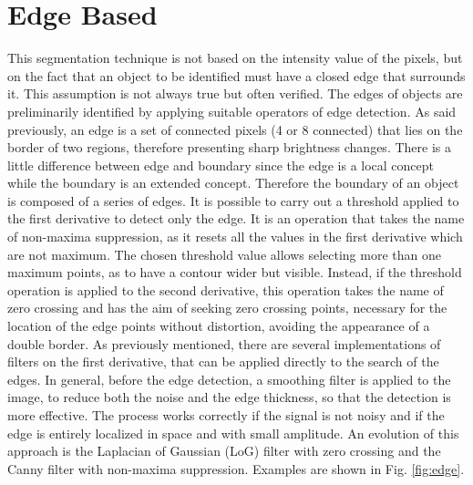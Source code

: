 \section{Edge Based}
This segmentation technique is not based on the intensity value of the pixels, but on the fact that an object to be identified must have a closed edge that surrounds it. This assumption is not always true but often verified. The edges of objects are preliminarily identified by applying suitable operators of edge detection. As said previously, an edge is a set of connected pixels (4 or 8 connected) that lies on the border of two regions, therefore presenting sharp brightness changes. There is a little difference between edge and boundary since the edge is a local concept while the boundary is an extended concept. Therefore the boundary of an object is composed of a series of edges.
It is possible to carry out a threshold applied to the first derivative to detect only the edge. It is an operation that takes the name of non-maxima suppression, as it resets all the values in the first derivative which are not maximum. The chosen threshold value allows selecting more than one maximum points, as to have a contour wider but visible. Instead, if the threshold operation is applied to the second derivative, this operation takes the name of zero crossing and has the aim of seeking zero crossing points, necessary for the location of the edge points without distortion, avoiding the appearance of a double border. As previously mentioned, there are several implementations of filters on the first derivative, that can be applied directly to the search of the edges. In general, before the edge detection, a smoothing filter is applied to the image, to reduce both the noise and the edge thickness, so that the detection is more effective. The process works correctly if the signal is not noisy and if the edge is entirely localized in space and with small amplitude. An evolution of this approach is the Laplacian of Gaussian (\acs{LoG}) filter with zero crossing and the Canny filter with non-maxima suppression.
Examples are shown in Fig. \ref{fig:edge}.

